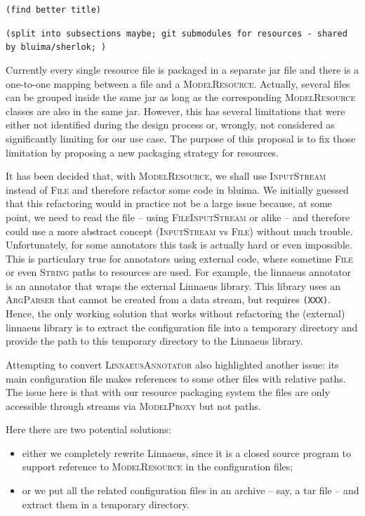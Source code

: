 \documentclass{article}
\newcommand{\id}[1]{\mbox{\textsc{#1}}}
\newcommand{\TODO}[1]{\texttt{\textcolor{YellowOrange}{(#1)}}} %
\begin{document}
\TODO{find better title}

\TODO{split into subsections maybe; git submodules for resources - shared by bluima/sherlok; }

Currently every single resource file is packaged in a separate jar file and there is a one-to-one mapping between a file and a \id{ModelResource}. Actually, several files can be grouped inside the same jar as long as the corresponding \id{ModelResource} classes are also in the same jar. However, this has several limitations that were either not identified during the design process or, wrongly, not considered as significantly limiting for our use case. The purpose of this proposal is to fix those limitation by proposing a new packaging strategy for resources.

It has been decided that, with \id{ModelResource}, we shall use \id{InputStream} instead of \id{File} and therefore refactor some code in bluima. We initially guessed that this refactoring would in practice not be a large issue because, at some point, we need to read the file -- using \id{FileInputStream} or alike -- and therefore could use a more abstract concept (\id{InputStream} vs \id{File}) without much trouble. Unfortunately, for some annotators this task is actually hard or even impossible. This is particulary true for annotators using external code, where sometime \id{File} or even \id{String} paths to resources are used. For example, the linnaeus annotator is an annotator that wraps the external Linnaeus library. This library uses an \id{ArgParser} that cannot be created from a data stream, but requires \TODO{XXX}. Hence, the only working solution that works without refactoring the (external) linnaeus library is to extract the configuration file into a temporary directory and provide the path to this temporary directory to the Linnaeus library.

Attempting to convert \id{LinnaeusAnnotator} also highlighted another issue: its main configuration file makes references to some other files with relative paths. The issue here is that with our resource packaging system the files are only accessible through streams via \id{ModelProxy} but not paths.

Here there are two potential solutions:

\begin{itemize}

\item either we completely rewrite Linnaeus, since it is a closed source program to support reference to \id{ModelResource} in the configuration files;

\item or we put all the related configuration files in an archive -- say, a tar file -- and extract them in a temporary directory.

\end{itemize}
\end{document}

